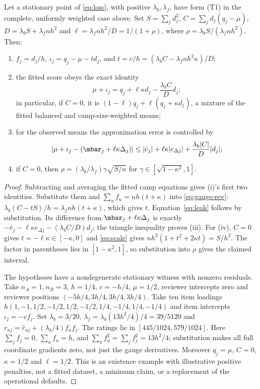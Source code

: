 \begin{proposition}\label{prop:leak}\proved{}
Let a stationary point of \eqref{eq:loss}, with positive $\lambda_b,\lambda_f$, have form (T1)
in the complete, uniformly weighted case above. Set $S=\sum_jd_j^2$,
$C=\sum_jd_j(q_j-\mu)$, $D=\lambda_bS+\lambda_fnh^2$ and
$\ell=\lambda_fnh^2/D=1/(1+\rho)$, where $\rho=\lambda_bS/(\lambda_fnh^2)$. Then:
\begin{enumerate}[label=(\roman*)]
  \item $f_j=d_j/h$, $\iota_j=q_j-\mu-t d_j$, and
    $t=c/h=(\lambda_b C-\lambda_fnh^2\kappa)/D$;
  \item the fitted score obeys the exact identity
  \begin{equation}\label{eq:leak}
    \mu+\iota_j=q_j+\ell\kappa d_j-\frac{\lambda_b C}{D}d_j;
  \end{equation}
  in particular, if $C=0$, it is $(1-\ell)q_j+\ell(q_j+\kappa d_j)$, a mixture of the
  fitted balanced and camp-size-weighted means;
  \item for the observed means the approximation error is controlled by
  \begin{equation}\label{eq:leak-error}
    \left|\mu+\iota_j-(\mbar_j+\ell\kappa\Delta_j)\right|
    \le |\bar e_j|+\ell\kappa|e_{\Delta j}|+\frac{\lambda_b|C|}{D}|d_j|;
  \end{equation}
  \item if $C=0$, then $\rho=(\lambda_b/\lambda_f)\gamma\sqrt{S/n}$ for
    $\gamma\in[\sqrt{1-\kappa^2},1]$.
\end{enumerate}
\end{proposition}
\begin{proof}
Subtracting and averaging the fitted camp equations gives (i)'s first two identities.
Substitute them and $\sum_uf_u=nh(t+\kappa)$ into \eqref{eq:gauge-rev}:
$\lambda_b(C-tS)/h=\lambda_fnh(t+\kappa)$, which gives $t$.
Equation~\eqref{eq:leak} follows by substitution. Its difference from
$\mbar_j+\ell\kappa\Delta_j$ is exactly
$-\bar e_j-\ell\kappa e_{\Delta j}-(\lambda_b C/D)d_j$; the triangle inequality proves (iii).
For (iv), $C=0$ gives $t=-\ell\kappa\in[-\kappa,0]$ and \eqref{eq:scale} gives
$nh^2(1+t^2+2\kappa t)=S/h^2$. The factor in parentheses lies in
$[1-\kappa^2,1]$, so substitution into $\rho$ gives the claimed interval.

The hypotheses have a nondegenerate stationary witness with nonzero residuals. Take
$n_A=1,n_B=3$, $h=1/4$, $c=-h/4$, $\mu=1/2$, reviewer intercepts zero and reviewer positions
$(-5h/4,3h/4,3h/4,3h/4)$. Take ten item loadings
$h(1,-1,1/2,-1/2,1/2,-1/2,1/4,-1/4,1/4,-1/4)$ and item intercepts $\iota_j=-cf_j$.
Set $\lambda_b=3/20$, $\lambda_f=\lambda_b(13h^2/4)/4=39/5120$ and
$r_{uj}=\hat r_{uj}+(\lambda_b/4)f_uf_j$. The ratings lie in $[445/1024,579/1024]$.
Here $\sum_jf_j=0$, $\sum_uf_u=h$, and
$\sum_uf_u^2=\sum_jf_j^2=13h^2/4$; substitution makes all full coordinate gradients zero,
not just the gauge derivatives. Moreover $q_j=\mu$, $C=0$, $\kappa=1/2$ and $\ell=1/2$.
This is an existence example with illustrative positive penalties, not a fitted dataset,
a minimum claim, or a replacement of the operational defaults.
\end{proof}

